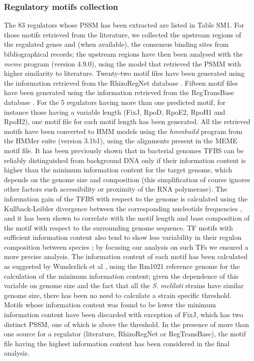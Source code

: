 \subsubsection{Regulatory motifs collection}
The 83 regulators whose PSSM has been extracted are listed in Table SM1. For those motifs retrieved from the literature, we collected the upstream regions of the regulated genes and (when available), the consensus binding sites from bibliographical records; the upstream regions have then been analysed with the \textit{meme} program \cite{bailey2009meme}(version 4.9.0), using the model that retrieved the PSMM with higher similarity to literature. Twenty-two motif files have been generated using the information retrieved from the RhizoRegNet database \cite{krol2011rhizoregnet}. Fifteen motif files have been generated using the information retrieved from the RegTransBase database \cite{kazakov2007regtransbase}. For the 5 regulators having more than one predicted motif, for instance those having a variable length (FixJ, RpoD, RpoE2, RpoH1 and RpoH2), one motif file for each motif length has been generated.
All the retrieved motifs have been converted to HMM models using the \textit{hmmbuild} program from the HMMer suite \cite{eddy2009new, johnson2010hidden, eddy2011accelerated}(version 3.1b1), using the alignments present in the MEME motif file.
It has been previously shown that in bacterial genomes TFBS can be reliably distinguished from background DNA only if their information content is higher than the minimum information content for the target genome, which depends on the genome size and composition \cite{wunderlich2009different} (this simplification of course ignores other factors such accessibility or proximity of the RNA polymerase). The information gain of the TFBS with respect to the genome is calculated using the Kullback-Leibler divergence between the corresponding nucleotide frequencies \cite{berg1987selection}, and it has been shown to correlate with the motif length and base composition of the motif with respect to the surrounding genome sequence. TF motifs with sufficient information content also tend to show less variability in their regulon composition between species \cite{quinn2014bacterial}; by focusing our analysis on such TFs we ensured a more precise analysis.
The information content of each motif has been calculated as suggested by Wunderlich et al \cite{wunderlich2009different}, using the Rm1021 reference genome for the calculation of the minimum information content; given the dependence of this variable on genome size and the fact that all the \textit{S. meliloti} strains have similar genome size, there has been no need to calculate a strain specific threshold. Motifs whose information content was found to be lower the minimum information content have been discarded with exception of FixJ, which has two distinct PSSM, one of which is above the threshold. In the presence of more than one source for a regulator (literature, RhizoRegNet or RegTransBase), the motif file having the highest information content has been considered in the final analysis.

